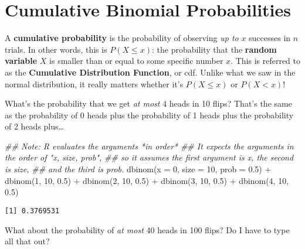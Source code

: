 \documentclass[
  letterpaper,
  DIV=11,
  numbers=noendperiod]{scrreprt}
\newenvironment{Shaded}{\begin{snugshade}}{\end{snugshade}}
\newcommand{\AttributeTok}[1]{\textcolor[rgb]{0.40,0.45,0.13}{#1}}
\newcommand{\DecValTok}[1]{\textcolor[rgb]{0.68,0.00,0.00}{#1}}
\newcommand{\DocumentationTok}[1]{\textcolor[rgb]{0.37,0.37,0.37}{\textit{#1}}}
\newcommand{\FloatTok}[1]{\textcolor[rgb]{0.68,0.00,0.00}{#1}}
\newcommand{\FunctionTok}[1]{\textcolor[rgb]{0.28,0.35,0.67}{#1}}
\newcommand{\NormalTok}[1]{\textcolor[rgb]{0.00,0.23,0.31}{#1}}
\newcommand{\SpecialCharTok}[1]{\textcolor[rgb]{0.37,0.37,0.37}{#1}}
\begin{document}
\hypertarget{cumulative-binomial-probabilities}{%
\section{Cumulative Binomial
Probabilities}\label{cumulative-binomial-probabilities}}

A \textbf{cumulative probability} is the probability of observing
\emph{up to} \(x\) successes in \(n\) trials. In other words, this is
\(P(X \le x)\): the probability that the \textbf{random variable} \(X\)
is smaller than or equal to some specific number \(x\). This is referred
to as the \textbf{Cumulative Distribution Function}, or cdf. Unlike what
we saw in the normal distribution, it really matters whether it's
\(P(X\le x)\) or \(P(X< x)\)!

What's the probability that we get \emph{at most} 4 heads in 10 flips?
That's the same as the probability of 0 heads plus the probability of 1
heads plus the probability of 2 heads plus\ldots{}

\begin{Shaded}
\begin{Highlighting}[]
\DocumentationTok{\#\# Note: R evaluates the arguments *in order*}
\DocumentationTok{\#\# It expects the arguments in the order of "x, size, prob",}
\DocumentationTok{\#\# so it assumes the first argument is x, the second is size,}
\DocumentationTok{\#\# and the third is prob.}
\FunctionTok{dbinom}\NormalTok{(}\AttributeTok{x =} \DecValTok{0}\NormalTok{, }\AttributeTok{size =} \DecValTok{10}\NormalTok{, }\AttributeTok{prob =} \FloatTok{0.5}\NormalTok{) }\SpecialCharTok{+}
  \FunctionTok{dbinom}\NormalTok{(}\DecValTok{1}\NormalTok{, }\DecValTok{10}\NormalTok{, }\FloatTok{0.5}\NormalTok{) }\SpecialCharTok{+}
  \FunctionTok{dbinom}\NormalTok{(}\DecValTok{2}\NormalTok{, }\DecValTok{10}\NormalTok{, }\FloatTok{0.5}\NormalTok{) }\SpecialCharTok{+}
  \FunctionTok{dbinom}\NormalTok{(}\DecValTok{3}\NormalTok{, }\DecValTok{10}\NormalTok{, }\FloatTok{0.5}\NormalTok{) }\SpecialCharTok{+}
  \FunctionTok{dbinom}\NormalTok{(}\DecValTok{4}\NormalTok{, }\DecValTok{10}\NormalTok{, }\FloatTok{0.5}\NormalTok{)}
\end{Highlighting}
\end{Shaded}

\begin{verbatim}
[1] 0.3769531
\end{verbatim}

What about the probability of \emph{at most} 40 heads in 100 flips? Do I
have to type all that out?
\end{document}
